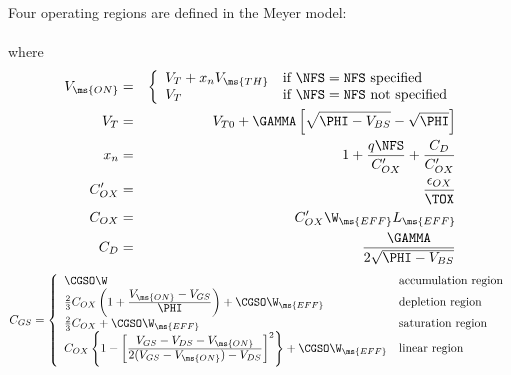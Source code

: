 Four operating regions are defined in the Meyer model:\\[0.1in]
\hspace*{\fill}\\[0.1in]
where
\begin{eqnarray}
V_{\ms{ON}}  & = & \left\{ \begin{array}{ll}
            V_{T} +  x_nV_{\ms{TH}} &
              \mbox{if } \NFS = {\tt NFS} \mbox{ specified}\\
            V_{T}                   & \mbox{if } \NFS = {\tt NFS}
                                       \mbox{ not specified}
            \end{array} \right.\\ %
V_{T} & = & V_{T0} + \GAMMA
        \left[\sqrt{\PHI - V_{BS}}-\sqrt{\PHI} \right]\\
x_n      & = & 1 + {{q \NFS} \over {C'_{OX}}} + {{C_D} \over {C'_{OX}}}\\
C'_{OX}&=&{{\epsilon_{OX}} \over { \TOX}}\\
C_{OX}&=& C'_{OX}\W_{\ms{EFF}} L_{\ms{EFF}}\\
C_D & = & {{\textstyle\GAMMA} \over {\textstyle 2 \sqrt{\PHI -
V_{BS}}}}
\end{eqnarray}
\begin{equation}
C_{GS} =  \left\{ \begin{array}{ll}
            \CGSO\W                     & \mbox{accumulation region}\\
            \frac{2}{3} C_{OX}
             \left( 1+ {{\textstyle V_{\ms{ON}}
             - V_{GS}} \over {\textstyle\PHI}}\right)
            + \CGSO\W_{\ms{EFF}}                   & \mbox{depletion region}\\
           \frac{2}{3} C_{OX} + \CGSO\W_{\ms{EFF}}  & \mbox{saturation region}\\
            C_{OX} \left\{ 1 - \left[
              {{\textstyle V_{GS} - V_{DS} - V_{\ms{ON}}} \over
               {\textstyle 2(V_{GS}-V_{\ms{ON}}) - V_{DS}}} \right]^2\right\}
            + \CGSO\W_{\ms{EFF}}  & \mbox{linear region}

            \end{array}
            \right. %
\end{equation}
